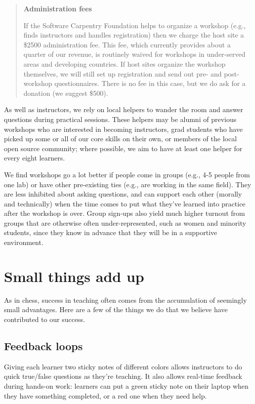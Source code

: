 \documentclass[10pt,a4paper,twocolumn]{article}
\begin{document}
\begin{quote}
\textbf{Administration fees}

If the Software Carpentry Foundation helps to organize a workshop
(e.g., finds instructors and handles registration) then we charge the
host site a \$2500 administration fee.  This fee, which currently
provides about a quarter of our revenue, is routinely waived for
workshops in under-served areas and developing countries.  If host
sites organize the workshop themselves, we will still set up
registration and send out pre- and post-workshop questionnaires.
There is no fee in this case, but we do ask for a donation (we suggest
\$500).

\end{quote}

As well as instructors, we rely on local helpers to wander the room
and answer questions during practical sessions. These helpers may be
alumni of previous workshops who are interested in becoming
instructors, grad students who have picked up some or all of our core
skills on their own, or members of the local open source community;
where possible, we aim to have at least one helper for every eight
learners.

We find workshops go a lot better if people come in groups (e.g., 4-5
people from one lab) or have other pre-existing ties (e.g., are
working in the same field). They are less inhibited about asking
questions, and can support each other (morally and technically) when
the time comes to put what they've learned into practice after the
workshop is over. Group sign-ups also yield much higher turnout from
groups that are otherwise often under-represented, such as women and
minority students, since they know in advance that they will be in a
supportive environment.

\section{Small things add up}

As in chess, success in teaching often comes from the accumulation of
seemingly small advantages. Here are a few of the things we do that we
believe have contributed to our success.

\subsection{Feedback loops}\label{s:feedback}

Giving each learner two sticky notes of different colors allows
instructors to do quick true/false questions as they're teaching. It
also allows real-time feedback during hands-on work: learners can put
a green sticky note on their laptop when they have something
completed, or a red one when they need help.
\end{document}
